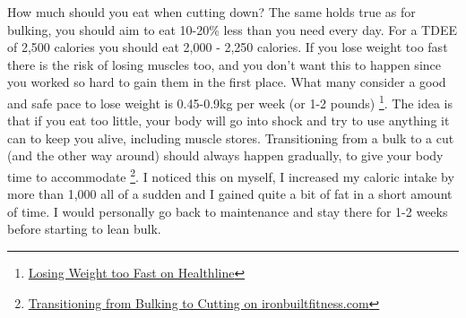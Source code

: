 \documentclass[openany, 12pt]{book}
\begin{document}
	How much should you eat when cutting down? The same holds true as for bulking, you should aim to eat 10-20\% less than you need every day. For a TDEE of 2,500 calories you should eat
        2,000 - 2,250 calories. If you lose weight too fast there is the risk of losing muscles too, and you don't want this to happen since you worked so hard to gain them in the first place. 
	What many consider a good and safe pace to lose weight is 0.45-0.9kg per week (or 1-2 pounds)
        \footnote{\href{https://www.healthline.com/nutrition/losing-weight-too-fast}{Losing Weight too Fast on Healthline}}. The idea is that if you eat too little, your body will go into shock and
        try to use anything it can to keep you alive, including muscle stores. Transitioning from a bulk to a cut (and the other way around) should always happen gradually, to give your body time to accommodate
        \footnote{\href{https://www.ironbuiltfitness.com/transition-from-cutting-to-bulking}{Transitioning from Bulking to Cutting on ironbuiltfitness.com}}. 
	I noticed this on myself, I increased my caloric intake by more than 1,000 all of a sudden and I gained quite a bit of fat in a short amount of time. I would
	personally go back to maintenance and stay there for 1-2 weeks before starting to lean bulk.
	
\end{document}
